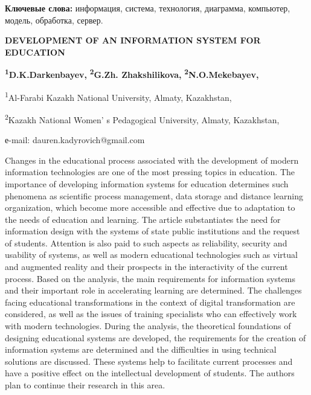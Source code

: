 {\bfseries Ключевые слова:} информация, система, технология, диаграмма,
компьютер, модель, обработка, сервер.

\begin{articleheader}
{\bfseries DEVELOPMENT OF AN INFORMATION SYSTEM FOR EDUCATION}

{\bfseries \textsuperscript{1}D.K.Darkenbayev\textsuperscript{\envelope },}
{\bfseries \textsuperscript{2}G.Zh. Zhakshilikova,}
{\bfseries \textsuperscript{2}N.O.Mekebayev,}
\end{articleheader}

\begin{affiliation}
\textsuperscript{1}Al-Farabi Kazakh National University, Almaty,
Kazakhstan,

\textsuperscript{2}Kazakh National Women' s Pedagogical
University, Almaty, Kazakhstan,

е-mail: dauren.kadyrovich@gmail.com
\end{affiliation}

Changes in the educational process associated with the development of
modern information technologies are one of the most pressing topics in
education. The importance of developing information systems for
education determines such phenomena as scientific process management,
data storage and distance learning organization, which become more
accessible and effective due to adaptation to the needs of education and
learning. The article substantiates the need for information design with
the systems of state public institutions and the request of students.
Attention is also paid to such aspects as reliability, security and
usability of systems, as well as modern educational technologies such as
virtual and augmented reality and their prospects in the interactivity
of the current process. Based on the analysis, the main requirements for
information systems and their important role in accelerating learning
are determined. The challenges facing educational transformations in the
context of digital transformation are considered, as well as the issues
of training specialists who can effectively work with modern
technologies. During the analysis, the theoretical foundations of
designing educational systems are developed, the requirements for the
creation of information systems are determined and the difficulties in
using technical solutions are discussed. These systems help to
facilitate current processes and have a positive effect on the
intellectual development of students. The authors plan to continue their
research in this area.

